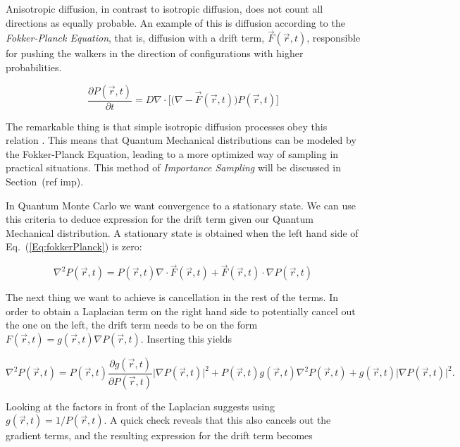 Anisotropic diffusion, in contrast to isotropic diffusion, does not count all directions as equally probable. An example of this is diffusion according to the \textit{Fokker-Planck Equation}, that is, diffusion with a drift term, $\vec F(\vec r, t)$, responsible for pushing the walkers in the direction of configurations with higher probabilities.

\begin{equation}
 \label{Eq:fokkerPlanck}
 \frac{\partial P(\vec r, t)}{\partial t} = D\nabla\cdot\Big[\Big(\nabla - \vec F(\vec r, t)\Big) P(\vec r, t)\Big] 
\end{equation}

The remarkable thing is that simple isotropic diffusion processes obey this relation \cite{abInitioMC}. This means that Quantum Mechanical distributions can be modeled by the Fokker-Planck Equation, leading to a more optimized way of sampling in practical situations. This method of \textit{Importance Sampling} will be discussed in Section~(ref imp). 

In Quantum Monte Carlo we want convergence to a stationary state. We can use this criteria to deduce expression for the drift term given our Quantum Mechanical distribution. A stationary state is obtained when the left hand side of Eq.~(\ref{Eq:fokkerPlanck}) is zero:

\begin{equation*}
 \nabla^2 P(\vec r, t) = P(\vec r, t)\nabla\cdot\vec F(\vec r, t) + \vec F(\vec r, t) \cdot \nabla P(\vec r, t)
\end{equation*}

The next thing we want to achieve is cancellation in the rest of the terms. In order to obtain a Laplacian term on the right hand side to potentially cancel out the one on the left, the drift term needs to be on the form $F(\vec r, t) = g(\vec r, t)\nabla P(\vec r, t)$. Inserting this yields

\begin{equation*}
  \nabla^2 P(\vec r, t) = P(\vec r, t)\frac{\partial g(\vec r, t)}{\partial P(\vec r, t)}\Big|\nabla P(\vec r, t)\Big|^2
  + P(\vec r, t)g(\vec r, t)\nabla^2 P(\vec r, t) + g(\vec r, t) \Big|\nabla P(\vec r, t)\Big|^2.
\end{equation*}

Looking at the factors in front of the Laplacian suggests using $g(\vec r, t) = 1/P(\vec r, t)$. A quick check reveals that this also cancels out the gradient terms, and the resulting expression for the drift term becomes

